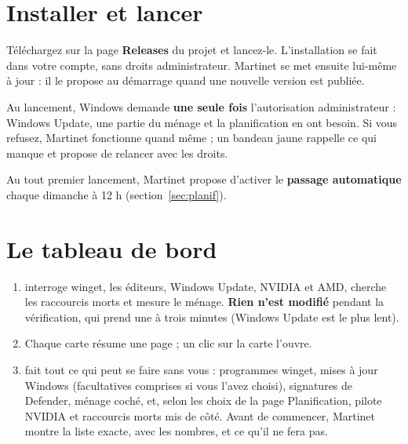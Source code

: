 \section{Installer et lancer}

Téléchargez  sur la page \textbf{Releases} du projet et lancez-le.
L'installation se fait dans votre compte, sans droits administrateur. Martinet se met ensuite
lui-même à jour : il le propose au démarrage quand une nouvelle version est publiée.

Au lancement, Windows demande \textbf{une seule fois} l'autorisation administrateur : Windows Update,
une partie du ménage et la planification en ont besoin. Si vous refusez, Martinet fonctionne quand
même ; un bandeau jaune rappelle ce qui manque et propose de relancer avec les droits.

Au tout premier lancement, Martinet propose d'activer le \textbf{passage automatique} chaque dimanche
à 12 h (section~\ref{sec:planif}).

\section{Le tableau de bord}\label{sec:accueil}


\begin{enumerate}
\item {} interroge winget, les éditeurs, Windows Update, NVIDIA et AMD, cherche les
raccourcis morts et mesure le ménage. \textbf{Rien n'est modifié} pendant la vérification, qui prend
une à trois minutes (Windows Update est le plus lent).
\item Chaque carte résume une page ; un clic sur la carte l'ouvre.
\item {} fait tout ce qui peut se faire sans vous : programmes winget,
mises à jour Windows (facultatives comprises si vous l'avez choisi), signatures de Defender, ménage
coché, et, selon les choix de la page Planification, pilote NVIDIA et raccourcis morts mis de côté.
Avant de commencer, Martinet montre la liste exacte, avec les nombres, et ce qu'il ne fera pas.
\end{enumerate}


